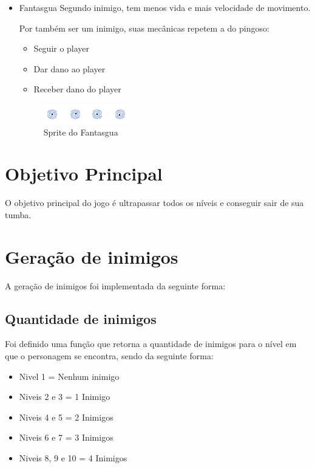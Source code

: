 \documentclass[a4paper]{scrreprt}
\begin{document}
\begin{itemize}
            \item Fantasgua
                Segundo inimigo, tem menos vida e mais velocidade de movimento.
                
                Por também ser um inimigo, suas mecânicas repetem a do pingoso:
                \begin{itemize}
                    \item Seguir o player
                    \item Dar dano ao player
                    \item Receber dano do player
                \end{itemize}
                \begin{figure}[H]
                    \centering
                    \includegraphics[width=.6\linewidth]{fantasgua.png}
                    \caption{Sprite do Fantasgua}
                    \label{fig:fantasgua}    
                \end{figure}    
        \end{itemize}

    \section{Objetivo Principal}
        O objetivo principal do jogo é ultrapassar todos os níveis e conseguir sair de sua tumba.
    
    \section{Geração de inimigos}
    A geração de inimigos foi implementada da seguinte forma:
    \subsection{Quantidade de inimigos}
	Foi definido uma função que retorna a quantidade de inimigos para o nível em que o personagem se encontra, sendo da seguinte forma:
	\begin{itemize}
	\item Nivel 1 = Nenhum inimigo
	\item Niveis 2 e 3 = 1 Inimigo
	\item Niveis 4 e 5 = 2 Inimigos
	\item Niveis 6 e 7 = 3 Inimigos 
	\item Niveis 8, 9 e 10 = 4 Inimigos
\end{itemize}	    
\end{document}
